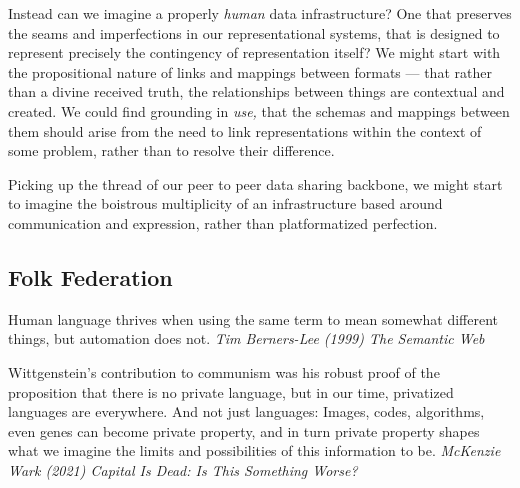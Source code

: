 Instead can we imagine a properly \emph{human} data infrastructure? One
that preserves the seams and imperfections in our representational
systems, that is designed to represent precisely the contingency of
representation itself? We might start with the propositional nature of
links and mappings between formats --- that rather than a divine
received truth, the relationships between things are contextual and
created. We could find grounding in \emph{use,} that the schemas and
mappings between them should arise from the need to link representations
within the context of some problem, rather than to resolve their
difference.

Picking up the thread of our peer to peer data sharing backbone, we
might start to imagine the boistrous multiplicity of an infrastructure
based around communication and expression, rather than platformatized
perfection.

\hypertarget{folk-federation}{%
\subsection{Folk Federation}\label{folk-federation}}

\begin{leftbar}
Human language thrives when using the same term to mean somewhat
different things, but automation does not. \emph{Tim Berners-Lee (1999)
The Semantic Web} \citep{berners-leeSemanticWeb2001} 
\end{leftbar}

\begin{leftbar}
Wittgenstein's contribution to communism was his robust proof of the
proposition that there is no private language, but in our time,
privatized languages are everywhere. And not just languages: Images,
codes, algorithms, even genes can become private property, and in turn
private property shapes what we imagine the limits and possibilities of
this information to be. \emph{McKenzie Wark (2021) Capital Is Dead: Is
This Something Worse?} \citep{warkCapitalDeadThis2021} 
\end{leftbar}

